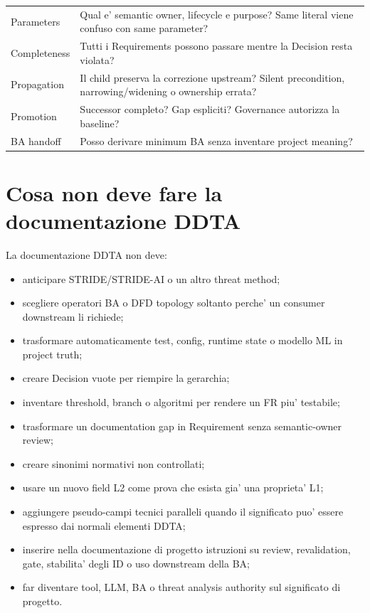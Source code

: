\documentclass[11pt,a4paper]{article}
\begin{document}
\begin{longtable}{L{36mm}L{110mm}}
Parameters & Qual e' semantic owner, lifecycle e purpose? Same literal viene confuso con same parameter? \\
Completeness & Tutti i Requirements possono passare mentre la Decision resta violata? \\
Propagation & Il child preserva la correzione upstream? Silent precondition, narrowing/widening o ownership errata? \\
Promotion & Successor completo? Gap espliciti? Governance autorizza la baseline? \\
BA handoff & Posso derivare minimum BA senza inventare project meaning? \\
\bottomrule
\end{longtable}

\section{Cosa non deve fare la documentazione DDTA}

La documentazione DDTA non deve:
\begin{itemize}
  \item anticipare STRIDE/STRIDE-AI o un altro threat method;
  \item scegliere operatori BA o DFD topology soltanto perche' un consumer downstream li richiede;
  \item trasformare automaticamente test, config, runtime state o modello ML in project truth;
  \item creare Decision vuote per riempire la gerarchia;
  \item inventare threshold, branch o algoritmi per rendere un FR piu' testabile;
  \item trasformare un documentation gap in Requirement senza semantic-owner review;
  \item creare sinonimi normativi non controllati;
  \item usare un nuovo field L2 come prova che esista gia' una proprieta' L1;
  \item aggiungere pseudo-campi tecnici paralleli quando il significato puo' essere espresso dai normali elementi DDTA;
  \item inserire nella documentazione di progetto istruzioni su review, revalidation, gate, stabilita' degli ID o uso downstream della BA;
  \item far diventare tool, LLM, BA o threat analysis authority sul significato di progetto.
\end{itemize}
\end{document}
